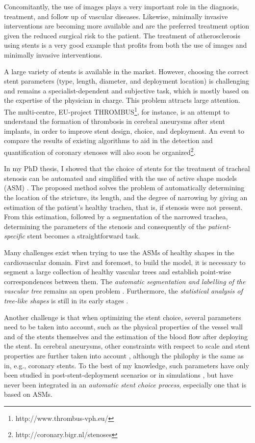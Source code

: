 \documentclass[a4paper]{article}
\newcommand{\citep}{\cite}
\begin{document}
Concomitantly, the use of images plays a very important role in the diagnosis, treatment, and follow up of vascular diseases. Likewise, minimally invasive interventions are becoming more available and are the preferred treatment option given the reduced surgical risk to the patient. The treatment of atherosclerosis using stents is a very good example that profits from both the use of images and minimally invasive interventions. 

A large variety of stents is available in the market. However, choosing the correct stent parameters (type, length, diameter, and deployment location) is challenging and remains a specialist-dependent and subjective task, which is mostly based on the expertise of the physician in charge. This problem attracts large attention. The multi-centre, EU-project THROMBUS\footnote{http://www.thrombus-vph.eu/}, for instance, is an attempt to understand the formation of thrombosis in cerebral aneurysms after stent implants, in order to improve stent design, choice, and deployment. An event to compare the results of existing algorithms to aid in the detection and quantification of coronary stenoses will also soon be organized\footnote{http://coronary.bigr.nl/stenoses}.

In my PhD thesis, I showed that the choice of stents for the treatment of tracheal stenosis can be automated and simplified with the use of active shape models (ASM) \citep{Cootes}. The proposed method solves the problem of automatically determining the location of the stricture, its length, and the degree of narrowing by giving an estimation of the patient's healthy trachea, that is, if stenosis were not present. From this estimation, followed by a segmentation of the narrowed trachea, determining the parameters of the stenosis and consequently of the {\em patient-specific} stent becomes a straightforward task. 

Many challenges exist when trying to use the ASMs of healthy shapes in the cardiovascular domain. First and foremost, to build the model, it is necessary to segment a large collection of healthy vascular trees and establish point-wise correspondences between them. The {\em automatic segmentation and labelling of the vascular tree} remains an open problem \citep{ORKI-08,Antiga,CARR-07,Scherl200721,Bemmel,Dikkers}. Furthermore, the {\em statistical analysis of tree-like shapes} is still in its early stages \citep{Feragen}. 

Another challenge is that when optimizing the stent choice, several parameters need to be taken into account, such as the physical properties of the vessel wall and of the stents themselves and the estimation of the blood flow after deploying the stent. In cerebral aneurysms, other constraints with respect to scale and stent properties are further taken into account \citep{larrabide:2439,Larrabide2010,bogunovic:210,zhang:1294}, although the philophy is the same as in, e.g., coronary stents. To the best of my knowledge, such parameters have only been studied in post-stent-deployment scenarios or in simulations \citep{deBeule,Florez2,Gori,Vuk,FLOR-07b,Sforza}, but have never been integrated in an {\em automatic stent choice process}, especially one that is based on ASMs. 
\end{document}
